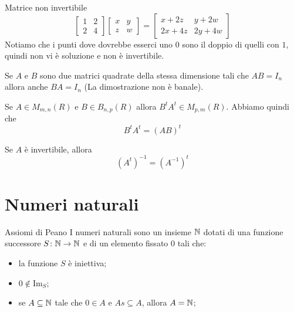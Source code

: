 \documentclass[a4paper]{article}
\begin{document}
\begin{snippetexample}{Matrice non invertibile}
    \[
        \begin{bmatrix}
            1 & 2 \\
            2 & 4
        \end{bmatrix}
        \begin{bmatrix}
            x & y \\
            z & w
        \end{bmatrix}
        =
        \begin{bmatrix}
            x+2z & y+2w \\
            2x+4z & 2y+4w
        \end{bmatrix}
    \]
    Notiamo che i punti dove dovrebbe esserci uno \(0\) sono il doppio di quelli con \(1\),
    quindi non vi è soluzione e non è invertibile.
\end{snippetexample}

Se \(A\) e \(B\) sono due matrici quadrate della stessa dimensione
tali che \(AB = I_n\) allora anche \(BA = I_n\) (La dimostrazione non è banale).

\begin{snippetproposition}{}
    Se \(A \in M_{m,n}(R)\) e \(B \in B_{n,p}(R)\) allora
    \(B^tA^t \in M_{p,m}(R)\). Abbiamo quindi che
    \[
        B^tA^t = {(AB)}^t
    \]
\end{snippetproposition}

\begin{snippetproposition}{}
    Se \(A\) è invertibile, allora
    \[
        {(A^t)}^{-1} = {(A^{-1})}^t
    \]
\end{snippetproposition}

\pagebreak

\section{Numeri naturali}

\begin{snippetdefinition}{Assiomi di Peano}
    I numeri naturali sono un insieme \(\mathbb{N}\) dotati di una funzione successore
    \(S \colon \mathbb{N} \to \mathbb{N}\)
    e di un elemento fissato \(0\) tali che:
    \begin{itemize}
        \item la funzione \(S\) è iniettiva;
        \item \(0 \not\in \text{Im}_S\);
        \item se \(A\subseteq \mathbb{N}\) tale che \(0\in A\) e \(As\subseteq A\), allora \(A = \mathbb{N}\);
    \end{itemize}
\end{snippetdefinition}
\end{document}
